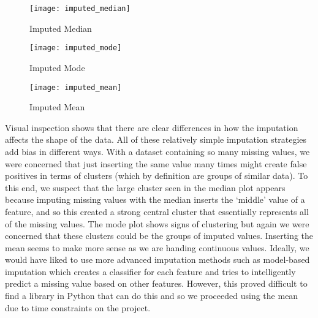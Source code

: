 \documentclass[journal]{IEEEtran}
\begin{document}
\begin{figure}[ht]
\centering
\texttt{[image: imputed\_median]}
\caption{Imputed Median}
\end{figure}

\begin{figure}[ht]
\centering
\texttt{[image: imputed\_mode]}
\caption{Imputed Mode}
\end{figure}

\begin{figure}[ht]
\centering
\texttt{[image: imputed\_mean]}
\caption{Imputed Mean}
\end{figure}

Visual inspection shows that there are clear differences in how the imputation affects the shape of the data. All of these relatively simple imputation strategies add bias in different ways. With a dataset containing so many missing values, we were concerned that just inserting the same value many times might create false positives in terms of clusters (which by definition are groups of similar data). To this end, we suspect that the large cluster seen in the median plot appears because imputing missing values with the median inserts the ‘middle’ value of a feature, and so this created a strong central cluster that essentially represents all of the missing values. The mode plot shows signs of clustering but again we were concerned that these clusters could be the groups of imputed values. Inserting the mean seems to make more sense as we are handing continuous values. Ideally, we would have liked to use more advanced imputation methods such as model-based imputation which creates a classifier for each feature and tries to intelligently predict a missing value based on other features. However, this proved difficult to find a library in Python that can do this and so we proceeded using the mean due to time constraints on the project.
\end{document}
